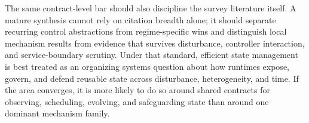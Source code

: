 \documentclass[acmsmall,screen,review]{acmart}
\begin{document}
The same contract-level bar should also discipline the survey literature itself. A mature synthesis cannot rely on citation breadth alone; it should separate recurring control abstractions from regime-specific wins and distinguish local mechanism results from evidence that survives disturbance, controller interaction, and service-boundary scrutiny. Under that standard, efficient state management is best treated as an organizing systems question about how runtimes expose, govern, and defend reusable state across disturbance, heterogeneity, and time. If the area converges, it is more likely to do so around shared contracts for observing, scheduling, evolving, and safeguarding state than around one dominant mechanism family.



\end{document}
